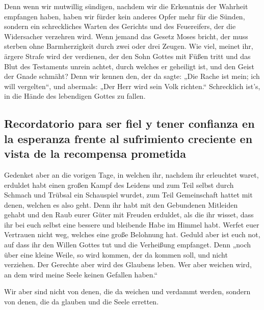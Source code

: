  Denn wenn wir mutwillig sündigen, nachdem wir die
Erkenntnis der Wahrheit empfangen haben, haben wir fürder kein anderes
Opfer mehr für die Sünden,  sondern ein schreckliches
Warten des Gerichts und des Feuereifers, der die Widersacher verzehren
wird.  Wenn jemand das Gesetz Moses bricht, der muss
sterben ohne Barmherzigkeit durch zwei oder drei Zeugen. 
Wie viel, meinet ihr, ärgere Strafe wird der verdienen, der den Sohn
Gottes mit Füßen tritt und das Blut des Testaments unrein achtet, durch
welches er geheiligt ist, und den Geist der Gnade schmäht?
 Denn wir kennen den, der da sagte: „Die Rache ist mein;
ich will vergelten``, und abermals: „Der Herr wird sein Volk richten.``
 Schrecklich ist's, in die Hände des lebendigen Gottes zu
fallen.

\hypertarget{recordatorio-para-ser-fiel-y-tener-confianza-en-la-esperanza-frente-al-sufrimiento-creciente-en-vista-de-la-recompensa-prometida}{%
\subsection{Recordatorio para ser fiel y tener confianza en la esperanza
frente al sufrimiento creciente en vista de la recompensa
prometida}\label{recordatorio-para-ser-fiel-y-tener-confianza-en-la-esperanza-frente-al-sufrimiento-creciente-en-vista-de-la-recompensa-prometida}}

 Gedenket aber an die vorigen Tage, in welchen ihr,
nachdem ihr erleuchtet waret, erduldet habt einen großen Kampf des
Leidens  und zum Teil selbst durch Schmach und Trübsal
ein Schauspiel wurdet, zum Teil Gemeinschaft hattet mit denen, welchen
es also geht.  Denn ihr habt mit den Gebundenen Mitleiden
gehabt und den Raub eurer Güter mit Freuden erduldet, als die ihr
wisset, dass ihr bei euch selbst eine bessere und bleibende Habe im
Himmel habt.  Werfet euer Vertrauen nicht weg, welches
eine große Belohnung hat.  Geduld aber ist euch not, auf
dass ihr den Willen Gottes tut und die Verheißung empfanget.
 Denn „noch über eine kleine Weile, so wird kommen, der
da kommen soll, und nicht verziehen.  Der Gerechte aber
wird des Glaubens leben. Wer aber weichen wird, an dem wird meine Seele
keinen Gefallen haben.``

 Wir aber sind nicht von denen, die da weichen und
verdammt werden, sondern von denen, die da glauben und die Seele
erretten.

